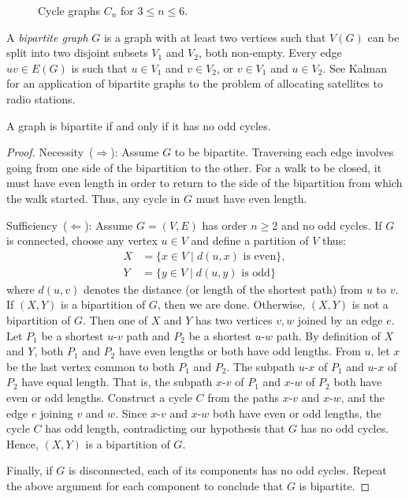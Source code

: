 \begin{figure}[!htbp]
\centering

\caption{Cycle graphs $C_n$ for $3 \leq n \leq 6$.}
\label{fig:introduction:four_cycle_graphs}
\end{figure}

A \emph{bipartite graph} $G$ is a graph with at
least two vertices such that $V(G)$ can be split into two disjoint
subsets $V_1$ and $V_2$, both non-empty. Every edge $uv \in E(G)$ is
such that $u \in V_1$ and $v \in V_2$, or $v \in V_1$ and $u \in V_2$.
See Kalman~\cite{Kalman1999} for an application of bipartite graphs to
the problem of allocating satellites to radio stations.

\begin{theorem}
A graph is bipartite if and only if it has no odd cycles.
\end{theorem}

\begin{proof}
Necessity~($\Longrightarrow$): Assume $G$ to be bipartite. Traversing
each edge involves going from one side of the bipartition to the
other. For a walk to be closed, it must have even length in order to
return to the side of the bipartition from which the walk
started. Thus, any cycle in $G$ must have even length.

Sufficiency~($\Longleftarrow$): Assume $G = (V, E)$ has order
$n \geq 2$ and no odd cycles. If $G$ is connected, choose any vertex
$u \in V$ and define a partition of $V$ thus:
\begin{align*}
X &= \{x \in V \mid d(u,x) \text{ is even}\}, \\
Y &= \{y \in V \mid d(u,y) \text{ is odd}\}
\end{align*}
where $d(u,v)$ denotes the distance (or length of the shortest path)
from $u$ to $v$. If $(X, Y)$ is a bipartition of $G$, then we are
done. Otherwise, $(X, Y)$ is not a bipartition of $G$. Then one of $X$
and $Y$ has two vertices $v,w$ joined by an edge $e$. Let $P_1$ be a
shortest $u$-$v$ path and $P_2$ be a shortest $u$-$w$ path. By
definition of $X$ and $Y$, both $P_1$ and $P_2$ have even lengths or
both have odd lengths. From $u$, let $x$ be the last vertex common to
both $P_1$ and $P_2$. The subpath $u$-$x$ of $P_1$ and $u$-$x$ of
$P_2$ have equal length. That is, the subpath $x$-$v$ of $P_1$ and
$x$-$w$ of $P_2$ both have even or odd lengths. Construct a cycle $C$
from the paths $x$-$v$ and $x$-$w$, and the edge $e$ joining $v$ and
$w$. Since $x$-$v$ and $x$-$w$ both have even or odd lengths, the
cycle $C$ has odd length, contradicting our hypothesis that $G$ has no
odd cycles. Hence, $(X,Y)$ is a bipartition of $G$.

Finally, if $G$ is disconnected, each of its components has no odd
cycles. Repeat the above argument for each component to conclude that
$G$ is bipartite.
\end{proof}


